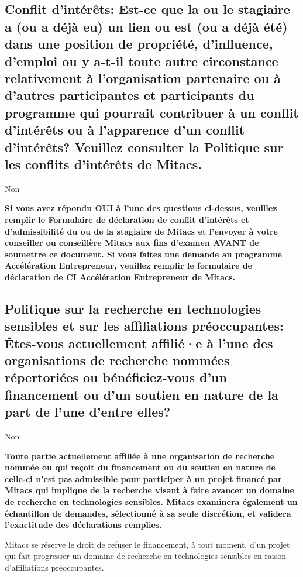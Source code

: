 \documentclass{mitacs-stagiaire}
\begin{document}
\subsection{Conflit d'intérêts: Est-ce que la ou le stagiaire a (ou a déjà eu) un lien ou est (ou a déjà été) dans une position de propriété, d'influence, d'emploi ou y a-t-il toute autre circonstance relativement à l'organisation partenaire ou à d'autres participantes et participants du programme qui pourrait contribuer à un conflit d'intérêts ou à l'apparence d'un conflit d'intérêts? Veuillez consulter la Politique sur les conflits d'intérêts de Mitacs.}

Non

{\bfseries
Si vous avez répondu \og{}OUI\fg{} à l'une des questions ci-dessus, veuillez remplir le Formulaire de déclaration de conflit d'intérêts et d'admissibilité du ou de la stagiaire de Mitacs et l'envoyer à votre conseiller ou conseillère Mitacs aux fins d'examen AVANT de soumettre ce document. Si vous faites une demande au programme Accélération Entrepreneur, veuillez remplir le formulaire de déclaration de CI Accélération Entrepreneur de Mitacs.
}

\subsection{Politique sur la recherche en technologies sensibles et sur les affiliations préoccupantes:
Êtes-vous actuellement affilié·e à l'une des organisations de recherche nommées répertoriées ou bénéficiez-vous d'un financement ou d'un soutien en nature de la part de l'une d'entre elles?}

Non

{\bfseries
Toute partie actuellement affiliée à une organisation de recherche nommée ou qui reçoit du financement ou du soutien en nature de celle-ci n'est pas admissible pour participer à un projet financé par Mitacs qui implique de la recherche visant à faire avancer un domaine de recherche en technologies sensibles. Mitacs examinera également un échantillon de demandes, sélectionné à sa seule discrétion, et validera l'exactitude des déclarations remplies.

Mitacs se réserve le droit de refuser le financement, à tout moment, d'un projet qui fait progresser un domaine de recherche en technologies sensibles en raison d'affiliations préoccupantes.
}

\newpage


\end{document}
